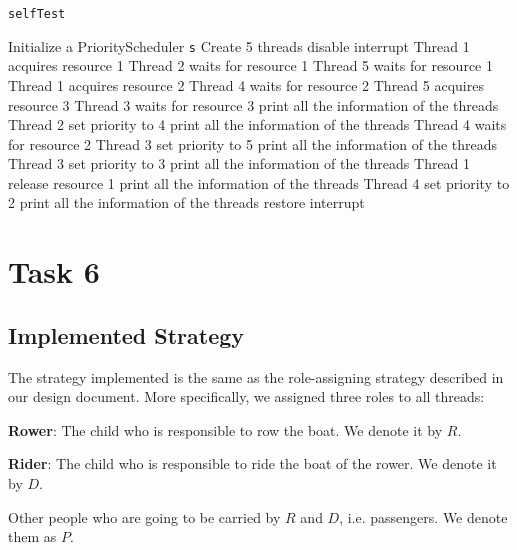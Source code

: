 \documentclass{article}
\begin{document}
\begin{spacing}{1.1}
\begin{algorithm}[htbp]
  \caption{\texttt{selfTest}}
\begin{algorithmic}[1]
  \STATE Initialize a PriorityScheduler \texttt{s}
  \STATE Create 5 threads
  \STATE disable interrupt
  \STATE
  \STATE Thread 1 acquires resource 1
  \STATE Thread 2 waits for resource 1
  \STATE Thread 5 waits for resource 1
  \STATE Thread 1 acquires resource 2
  \STATE Thread 4 waits for resource 2
  \STATE Thread 5 acquires resource 3
  \STATE Thread 3 waits for resource 3
  \STATE print all the information of the threads
  \STATE
  \STATE Thread 2 set priority to 4
  \STATE print all the information of the threads
  \STATE
  \STATE Thread 4 waits for resource 2
  \STATE Thread 3 set priority to 5
  \STATE print all the information of the threads
  \STATE
  \STATE Thread 3 set priority to 3
  \STATE print all the information of the threads
  \STATE
  \STATE Thread 1 release resource 1
  \STATE print all the information of the threads
  \STATE
  \STATE Thread 4 set priority to 2
  \STATE print all the information of the threads
  \STATE
  \STATE restore interrupt
\end{algorithmic}
\end{algorithm}


\section{Task 6}

\subsection{Implemented Strategy}
The strategy implemented is the same as the role-assigning strategy described in our design document. More specifically, we assigned three roles to all threads:
\begin{asparaitem}
  \item \textbf{Rower}: The child who is responsible to row the boat. We denote it by $R$.\\
  \item \textbf{Rider}: The child who is responsible to ride the boat of the rower. We denote it by $D$.\\
  \item Other people who are going to be carried by $R$ and $D$, i.e. passengers. We denote them as $P$.\\
\end{asparaitem}


\end{spacing}
\end{document}

